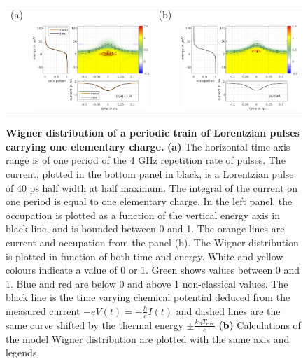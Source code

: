 \begin{figure}[hpbt]
	\begin{center}
		\begin{tabular}{c c c c}
		(a) & & (b) &  \\ 
		& \includegraphics[width = 6.5cm]{./chap1/wigData_leviton_40ps_1e_51mK_Projected_Gradient_Method} &
		& \includegraphics[width = 6.5cm]{./chap1/wigTheory_leviton_40ps_1e_50mK_6th_harm}
		\end{tabular} 
	\end{center}
	\caption{\textbf{Wigner distribution of a periodic train of Lorentzian pulses carrying one elementary charge.} \textbf{(a)} The horizontal time axis range is of one period of the 4 GHz repetition rate of pulses. The current, plotted in the bottom panel in black, is a Lorentzian pulse of 40 ps half width at half maximum. The integral of the current on one period is equal to one elementary charge. In the left panel, the occupation is plotted as a function of the vertical energy axis in black line, and is bounded between 0 and 1. The orange lines are current and occupation from the panel (b). The Wigner distribution is plotted in function of both time and energy. White and yellow colours indicate a value of 0 or 1. Green shows values between 0 and 1. Blue and red are below 0 and above 1 non-classical values. The black line is the time varying chemical potential deduced from the measured current $-eV(t) = -\frac{h}{e}I(t)$ and dashed lines are the same curve shifted by the thermal energy $\pm \frac{k_{\mathrm{B}}T_{\mathrm{elec}}}{e}$ \textbf{(b)} Calculations of the model Wigner distribution are plotted with the same axis and legends.}
	\label{fig: wigner du 1e 40ps}
\end{figure}

